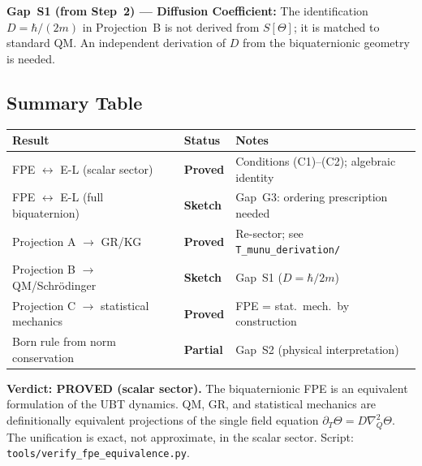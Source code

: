 \documentclass[12pt,a4paper]{article}
\theoremstyle{definition}
\theoremstyle{remark}
\begin{document}
\begin{gapbox}
\textbf{Gap~S1 (from Step~2) --- Diffusion Coefficient:}
The identification $D = \hbar/(2m)$ in Projection~B is not derived
from $S[\Theta]$; it is matched to standard QM.  An independent
derivation of $D$ from the biquaternionic geometry is needed.
\end{gapbox}

\subsection{Summary Table}
\label{subsec:summary}

\begin{center}
\begin{tabular}{lll}
  \toprule
  \textbf{Result} & \textbf{Status} & \textbf{Notes} \\
  \midrule
  FPE $\leftrightarrow$ E-L (scalar sector) & \textcolor{green!60!black}{\textbf{Proved}} &
    Conditions (C1)--(C2); algebraic identity \\
  FPE $\leftrightarrow$ E-L (full biquaternion) & \textbf{Sketch} &
    Gap~G3: ordering prescription needed \\
  Projection A $\to$ GR/KG & \textcolor{green!60!black}{\textbf{Proved}} &
    Re-sector; see \texttt{T\_munu\_derivation/} \\
  Projection B $\to$ QM/Schr\"{o}dinger & \textbf{Sketch} &
    Gap~S1 ($D=\hbar/2m$) \\
  Projection C $\to$ statistical mechanics & \textcolor{green!60!black}{\textbf{Proved}} &
    FPE = stat.~mech.\ by construction \\
  Born rule from norm conservation & \textbf{Partial} &
    Gap~S2 (physical interpretation) \\
  \bottomrule
\end{tabular}
\end{center}

\begin{resultbox}
\textbf{Verdict: PROVED (scalar sector).}
The biquaternionic FPE is an equivalent formulation of the UBT dynamics.
QM, GR, and statistical mechanics are definitionally equivalent projections
of the single field equation $\partial_T\Theta = D\nabla_Q^2\Theta$.
The unification is exact, not approximate, in the scalar sector.
Script: \texttt{tools/verify\_fpe\_equivalence.py}.
\end{resultbox}

\ifdefined\INCLUDEMODE
\else
  
\end{document}
